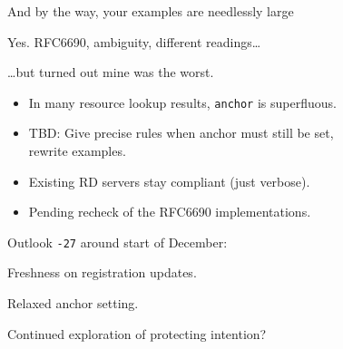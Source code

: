 \documentclass[aspectratio=169]{beamer}
\begin{document}
\begin{frame}{And by the way, your examples are needlessly large}\Large

	Yes. RFC6690, ambiguity, different readings\ldots

	\bigskip
	\pause

	\ldots but turned out mine was the worst.

	\bigskip

	\begin{itemize}
		\item In many resource lookup results, \texttt{anchor} is superfluous.
		\item TBD: Give precise rules when anchor must still be set, \\ rewrite examples.
		\item Existing RD servers stay compliant (just verbose).
		\item Pending recheck of the RFC6690 implementations.
	\end{itemize}
\end{frame}

\begin{frame}{Outlook}\Large
	\texttt{-27} around start of December:

	\bigskip

	Freshness on registration updates.

	\bigskip

	Relaxed anchor setting.

	\bigskip

	Continued exploration of protecting intention?
\end{frame}
\end{document}
